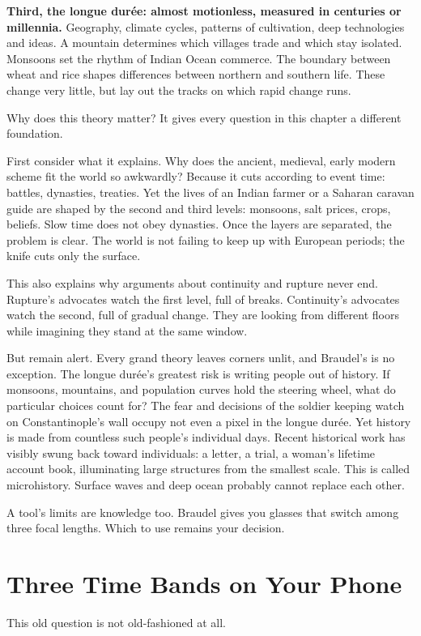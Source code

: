 \textbf{Third, the longue durée: almost motionless, measured in centuries or millennia.} Geography, climate cycles, patterns of cultivation, deep technologies and ideas. A mountain determines which villages trade and which stay isolated. Monsoons set the rhythm of Indian Ocean commerce. The boundary between wheat and rice shapes differences between northern and southern life. These change very little, but lay out the tracks on which rapid change runs.

Why does this theory matter? It gives every question in this chapter a different foundation.

First consider what it explains. Why does the ancient, medieval, early modern scheme fit the world so awkwardly? Because it cuts according to event time: battles, dynasties, treaties. Yet the lives of an Indian farmer or a Saharan caravan guide are shaped by the second and third levels: monsoons, salt prices, crops, beliefs. Slow time does not obey dynasties. Once the layers are separated, the problem is clear. The world is not failing to keep up with European periods; the knife cuts only the surface.

This also explains why arguments about continuity and rupture never end. Rupture's advocates watch the first level, full of breaks. Continuity's advocates watch the second, full of gradual change. They are looking from different floors while imagining they stand at the same window.

But remain alert. Every grand theory leaves corners unlit, and Braudel's is no exception. The longue durée's greatest risk is writing people out of history. If monsoons, mountains, and population curves hold the steering wheel, what do particular choices count for? The fear and decisions of the soldier keeping watch on Constantinople's wall occupy not even a pixel in the longue durée. Yet history is made from countless such people's individual days. Recent historical work has visibly swung back toward individuals: a letter, a trial, a woman's lifetime account book, illuminating large structures from the smallest scale. This is called microhistory. Surface waves and deep ocean probably cannot replace each other.

A tool's limits are knowledge too. Braudel gives you glasses that switch among three focal lengths. Which to use remains your decision.

\section{Three Time Bands on Your Phone}
This old question is not old-fashioned at all.

